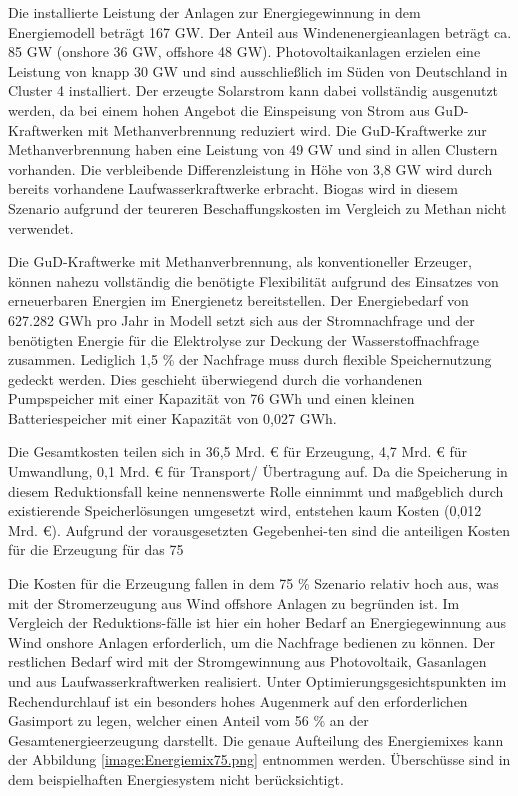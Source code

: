 Die installierte Leistung der Anlagen zur Energiegewinnung in dem Energiemodell beträgt 167 GW. Der Anteil aus Windenenergieanlagen beträgt ca. 85 GW (onshore 36 GW, offshore 48 GW). Photovoltaikanlagen erzielen eine Leistung von knapp 30 GW und sind ausschließlich im Süden von Deutschland in Cluster 4 installiert. Der erzeugte Solarstrom kann dabei vollständig ausgenutzt werden, da bei einem hohen Angebot die Einspeisung von Strom aus GuD-Kraftwerken mit Methanverbrennung reduziert wird. Die GuD-Kraftwerke zur Methanverbrennung haben eine Leistung von 49 GW und sind in allen Clustern vorhanden. Die verbleibende Differenzleistung in Höhe von 3,8 GW wird durch bereits vorhandene Laufwasserkraftwerke erbracht. Biogas wird in diesem Szenario aufgrund der teureren Beschaffungskosten im Vergleich zu Methan nicht verwendet. 

Die GuD-Kraftwerke mit Methanverbrennung, als konventioneller Erzeuger, können nahezu vollständig die benötigte Flexibilität aufgrund des Einsatzes von erneuerbaren Energien im Energienetz bereitstellen. Der Energiebedarf von 627.282 GWh pro Jahr in Modell setzt sich aus der Stromnachfrage und der benötigten Energie für die Elektrolyse zur Deckung der Wasserstoffnachfrage zusammen. Lediglich 1,5 \% der Nachfrage muss durch flexible Speichernutzung gedeckt werden. Dies geschieht überwiegend durch die vorhandenen Pumpspeicher mit einer Kapazität von 76 GWh und einen kleinen Batteriespeicher mit einer Kapazität von 0,027 GWh.

Die Gesamtkosten teilen sich in 36,5 Mrd. € für Erzeugung, 4,7 Mrd. € für Umwandlung, 0,1 Mrd. € für Transport/ Übertragung auf. Da die Speicherung in diesem Reduktionsfall keine nennenswerte Rolle einnimmt und maßgeblich durch existierende Speicherlösungen umgesetzt wird, entstehen kaum Kosten (0,012 Mrd. €). Aufgrund der vorausgesetzten Gegebenhei-ten sind die anteiligen Kosten für die Erzeugung für das 75 %

Die Kosten für die Erzeugung fallen in dem 75 \% Szenario relativ hoch aus, was mit der Stromerzeugung aus Wind offshore Anlagen zu begründen ist. Im Vergleich der Reduktions-fälle ist hier ein hoher Bedarf an Energiegewinnung aus Wind onshore Anlagen erforderlich, um die Nachfrage bedienen zu können. Der restlichen Bedarf wird mit der Stromgewinnung aus Photovoltaik, Gasanlagen und aus Laufwasserkraftwerken realisiert. Unter Optimierungsgesichtspunkten im Rechendurchlauf ist ein besonders hohes Augenmerk auf den erforderlichen Gasimport zu legen, welcher einen Anteil vom 56 \% an der Gesamtenergieerzeugung darstellt. Die genaue Aufteilung des Energiemixes kann der Abbildung \ref{image:Energiemix75.png} entnommen werden. Überschüsse sind in dem beispielhaften Energiesystem nicht berücksichtigt. 

